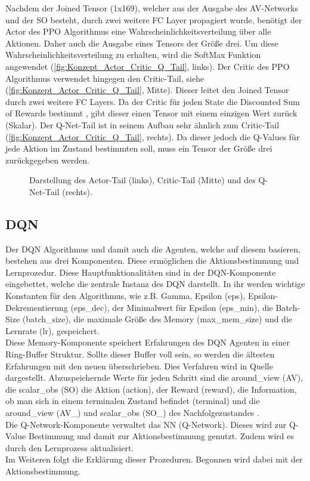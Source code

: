 Nachdem der Joined Tensor (1x169), welcher aus der Ausgabe des AV-Networks und der SO besteht, durch zwei weitere FC Layer propagiert wurde, benötigt der Actor des PPO Algorithmus eine Wahrscheinlichkeitsverteilung über alle Aktionen. Daher auch die Ausgabe eines Tensors der Größe drei. Um diese Wahrscheinlichkeitsverteilung zu erhalten, wird die SoftMax Funktion angewendet (\autoref{fig:Konzept_Actor_Critic_Q_Tail}, links).
Der Critic des PPO Algorithmus verwendet hingegen den Critic-Tail, siehe (\autoref{fig:Konzept_Actor_Critic_Q_Tail}, Mitte). Dieser leitet den Joined Tensor durch zwei weitere FC Layers. Da der Critic für jeden State die Discounted Sum of Rewards bestimmt , gibt dieser einen Tensor mit einem einzigen Wert zurück (Skalar).
Der Q-Net-Tail ist in seinem Aufbau sehr ähnlich zum Critic-Tail (\autoref{fig:Konzept_Actor_Critic_Q_Tail}, rechts). Da dieser jedoch die Q-Values für jede Aktion im Zustand bestimmten soll, muss ein Tensor der Größe drei zurückgegeben werden.
\begin{figure}[H]
	\centering
	
	\caption[Actor-, Critic- und Q-Net-Tail]{Darstellung des Actor-Tail (links), Critic-Tail (Mitte) und des Q-Net-Tail (rechts).}
	\label{fig:Konzept_Actor_Critic_Q_Tail}
\end{figure}

\subsection{DQN} \label{subsec:Konzept_DQN}
Der DQN Algorithmus und damit auch die Agenten, welche auf diesem basieren, bestehen aus drei Komponenten. Diese ermöglichen die Aktionsbestimmung und Lernprozedur.
Diese Hauptfunktionalitäten sind in der DQN-Komponente eingebettet, welche die zentrale Instanz des DQN darstellt. In ihr werden wichtige Konstanten für den Algorithmus, wie z.B. Gamma, Epsilon (eps), Epsilon-Dekrementierung (eps\_dec), der Minimalwert für Epsilon (eps\_min), die Batch-Size (batch\_size), die maximale Größe des Memory (max\_mem\_size) und die Lernrate (lr), gespeichert.\\
Diese Memory-Komponente speichert Erfahrungen des DQN Agenten in einer Ring-Buffer Struktur. Sollte dieser Buffer voll sein, so werden die ältesten Erfahrungen mit den neuen überschrieben. Dies Verfahren wird in Quelle \cite[S. 5]{DBLP:journals/corr/MnihKSGAWR13} dargestellt.
Abzuspeichernde Werte für jeden Schritt sind die around\_view (AV), die scalar\_obs (SO) die Aktion (action), der Reward (reward), die Information, ob man sich in einem terminalen Zustand befindet (terminal) und die around\_view (AV\_) und scalar\_obs (SO\_) des Nachfolgezustandes .\\
Die Q-Network-Komponente verwaltet das NN (Q-Network). Dieses wird zur Q-Value Bestimmung und damit zur Aktionsbestimmung genutzt. Zudem wird es durch den Lernprozess aktualisiert.\\
Im Weiteren folgt die Erklärung dieser Prozeduren. Begonnen wird dabei mit der Aktionsbestimmung.


